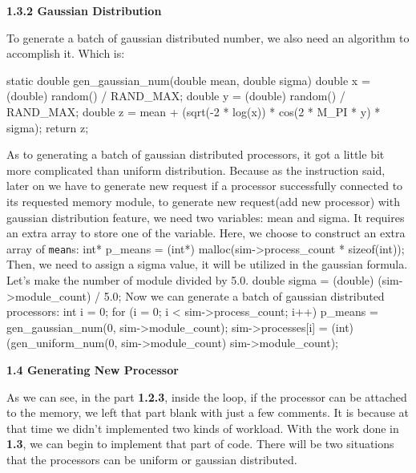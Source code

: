 \documentclass{article}%
\newenvironment{code}%
   {\snugshade\verbatim}%
   {\endverbatim\endsnugshade}
\begin{document}
\begin{Large}
\begin{flushleft}
\textbf{1.3.2 Gaussian Distribution}
\end{flushleft}

To generate a batch of gaussian distributed number, we also need an algorithm to accomplish it. Which is:

\begin{code}
    static double gen_gaussian_num(double mean, double sigma){
        double x = (double) random() / RAND_MAX;
        double y = (double) random() / RAND_MAX;
        double z = mean + (sqrt(-2 * log(x)) 
                           * cos(2 * M_PI * y) 
                           * sigma);
        return z;
    }
\end{code}

As to generating a batch of gaussian distributed processors, it got a little bit more complicated than uniform distribution. Because as the instruction said, later on we have to generate new request if a processor successfully connected to its requested memory module, to generate new request(add new processor) with gaussian distribution feature, we need two variables: mean and sigma. It requires an extra array to store one of the variable. Here, we choose to construct an extra array of \texttt{mean}s:
\begin{code}
    int* p_means = (int*) malloc(sim->process_count * sizeof(int));
\end{code}
Then, we need to assign a sigma value, it will be utilized in the gaussian formula. Let's make the number of module divided by 5.0. 
\begin{code}
    double sigma = (double) (sim->module_count) / 5.0;
\end{code}
Now we can generate a batch of gaussian distributed processors:
\newpage
\begin{code}
    int i = 0;
    for (i = 0; i < sim->process_count; i++) {
        p_means = gen_gaussian_num(0, sim->module_count);
        sim->processes[i] = (int)
                            (gen_uniform_num(0, sim->module_count) %
                            sim->module_count);
    }
\end{code}
\begin{LARGE}
\begin{flushleft}
\textbf{1.4 Generating New Processor}
\end{flushleft}
\end{LARGE}
As we can see, in the part \textbf{1.2.3}, inside the loop, if the processor can be attached to the memory, we left that part blank with just a few comments. It is because at that time we didn't implemented two kinds of workload. With the work done in \textbf{1.3}, we can begin to implement that part of code. There will be two situations that the processors can be uniform or gaussian distributed.


\end{Large}
\end{document}
